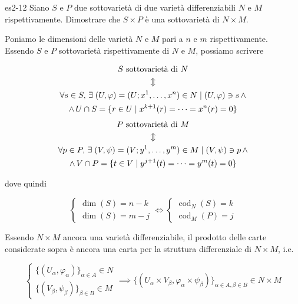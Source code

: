 {es2-12}
{
Siano $ S $ e $ P $ due sottovarietà di due varietà differenziabili $ N $ e $ M $ rispettivamente. Dimostrare che $ S \times P $ è una sottovarietà di $ N \times M $.
}
{
Poniamo le dimensioni delle varietà $ N $ e $ M $ pari a $ n $ e $ m $ rispettivamente. \\
Essendo $ S $ e $ P $ sottovarietà rispettivamente di $ N $ e $ M $, possiamo scrivere

\begin{gather}
	S \text{ sottovarietà di } N \nonumber \\
	\Updownarrow \\
	\forall s \in S, \, \exists \; (U,\varphi) = (U; x^{1},\dots,x^{n}) \in N \mid (U,\varphi) \ni s \, \wedge \nonumber \\
	\wedge \, U \cap S = \{ r \in U \mid x^{k+1}(r) = \dots = x^{n}(r) = 0 \} \nonumber
\end{gather}
%
\begin{gather}
	P \text{ sottovarietà di } M \nonumber \\
	\Updownarrow \\
	\forall p \in P, \, \exists \; (V,\psi) = (V; y^{1},\dots,y^{m}) \in M \mid (V,\psi) \ni p \, \wedge \nonumber \\
	\wedge \, V \cap P = \{ t \in V \mid y^{j+1}(t) = \dots = y^{m}(t) = 0 \} \nonumber
\end{gather}

dove quindi

\begin{equation}
	\begin{cases}
		\dim(S) = n - k \\
		\dim(S) = m - j
	\end{cases} %
	\iff %
	\begin{cases}
		\operatorname{cod}_{N}(S) = k \\
		\operatorname{cod}_{M}(P) = j
	\end{cases}
\end{equation}

Essendo $ N \times M $ ancora una varietà differenziabile, il prodotto delle carte considerate sopra è ancora una carta per la struttura differenziale di $ N \times M $, i.e.

\begin{equation}
	\begin{cases}
		\{(U_{\alpha},\varphi_{\alpha})\}_{\alpha \in A} \in N \\
		\{(V_{\beta},\psi_{\beta})\}_{\beta \in B} \in M
	\end{cases} %
	\implies %
	\{(U_{\alpha} \times V_{\beta}, \varphi_{\alpha} \times \psi_{\beta})\}_{\alpha \in A, \beta \in B} \in N \times M
\end{equation}

}
